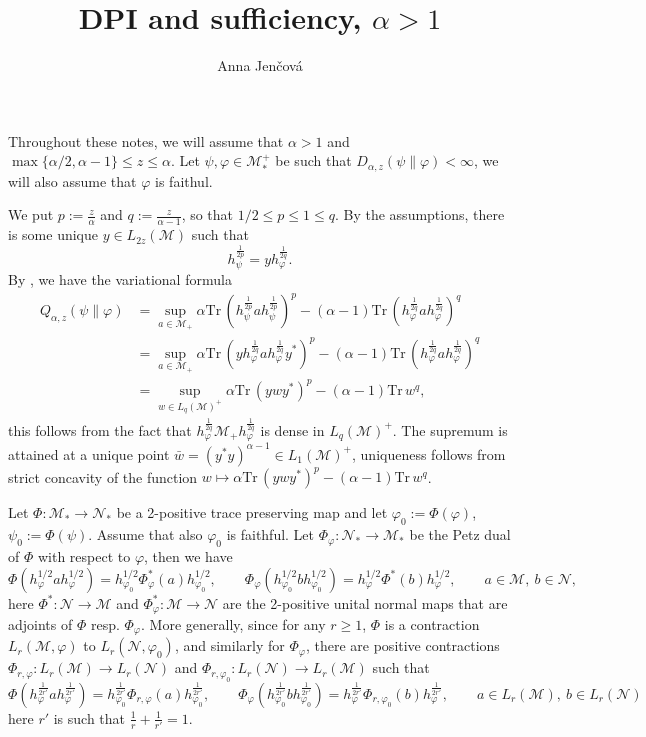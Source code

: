 \documentclass[12pt]{article}
\title{DPI and sufficiency, $\alpha>1$}
\author{Anna Jen\v cov\'a}
\theoremstyle{definition}
\theoremstyle{remark}
\def\Me{\mathcal M}
\def\Ne{\mathcal N}
\def \Tr{\mathrm{Tr}\,}
\begin{document}
\maketitle

Throughout these notes, we will assume that $\alpha>1$ and $\max\{\alpha/2,\alpha-1\}\le
z\le \alpha$. Let $\psi,\varphi\in \Me_*^+$ be such that
$D_{\alpha,z}(\psi\|\varphi)<\infty$, we will also assume that $\varphi$ is faithul. 

We put $p:=\frac z{\alpha}$ and $q:=\frac z{\alpha-1}$, so that $1/2\le p\le 1\le q$. By the
assumptions, there is some unique $y\in L_{2z}(\Me)$ such that 
\begin{equation}\label{eq:y}
h_\psi^{\frac1{2p}}=yh_\varphi^{\frac1{2q}}.
\end{equation}
By \cite{kato2023onrenyi,SKnote}, we have the variational formula
\begin{align*}
Q_{\alpha,z}(\psi\|\varphi)&=\sup_{a\in \Me_+} \alpha
\Tr(h_\psi^{\frac1{2p}}ah_\psi^{\frac1{2p}})^p-(\alpha-1)\Tr(h_\varphi^{\frac1{2q}}ah_\varphi^{\frac1{2q}})^q\\
&=\sup_{a\in \Me_+} \alpha
\Tr(yh_\varphi^{\frac1{2q}}ah_\varphi^{\frac1{2q}}y^*)^p-(\alpha-1)\Tr(h_\varphi^{\frac1{2q}}ah_\varphi^{\frac1{2q}})^q\\
&=\sup_{w\in L_q(\Me)^+}\alpha\Tr(ywy^*)^p-(\alpha-1)\Tr w^q,
\end{align*}
this follows from the fact that $h_\varphi^{\frac1{2q}}\Me_+h_\varphi^{\frac1{2q}}$ is
dense in $L_q(\Me)^+$. The supremum is attained at a unique point $\bar
w=(y^*y)^{\alpha-1}\in L_1(\Me)^+$, uniqueness follows from strict concavity of the
function $w\mapsto \alpha\Tr(ywy^*)^p-(\alpha-1)\Tr w^q$. 

Let $\Phi:\Me_*\to \Ne_*$ be a 2-positive trace preserving map and let 
$\varphi_0:=\Phi(\varphi)$, $\psi_0:=\Phi(\psi)$. Assume that also $\varphi_0$ is faithful. Let $\Phi_\varphi:
\Ne_*\to\Me_*$ be the Petz dual of $\Phi$ with respect to $\varphi$, then we have
\[
\Phi(h_\varphi^{1/2}ah_\varphi^{1/2})=h_{\varphi_0}^{1/2}\Phi_\varphi^*(a)h_{\varphi_0}^{1/2},\qquad 
\Phi_\varphi(h_{\varphi_0}^{1/2}bh_{\varphi_0}^{1/2})=h_{\varphi}^{1/2}\Phi^*(b)h_{\varphi}^{1/2},
\qquad a\in \Me,\ b\in \Ne,
\]
here $\Phi^*:\Ne\to\Me$ and $\Phi^*_\varphi:\Me\to \Ne$ are the 2-positive unital normal
maps that are adjoints of $\Phi$ resp. $\Phi_\varphi$. More generally, since for any $r\ge
1$, $\Phi$ is a contraction $L_r(\Me,\varphi)$ to $L_r(\Ne,\varphi_0)$, and similarly for
$\Phi_\varphi$, there are positive contractions $\Phi_{r,\varphi}:L_r(\Me)\to L_r(\Ne)$
and $\Phi_{r,\varphi_0}:L_r(\Ne)\to L_r(\Me)$ such that 
\[
\Phi(h_\varphi^{\frac1{2r'}}ah_\varphi^{\frac1{2r'}})=h_{\varphi_0}^{\frac1{2r'}}\Phi_{r,\varphi}(a)h_{\varphi_0}^{\frac1{2r'}},\qquad 
\Phi_\varphi(h_{\varphi_0}^{\frac1{2r'}}bh_{\varphi_0}^{\frac1{2r'}})=h_{\varphi}^{\frac1{2r'}}\Phi_{r,\varphi_0}(b)h_{\varphi}^{\frac1{2r'}},
\qquad a\in L_r(\Me),\ b\in L_r(\Ne)
\]
here $r'$ is such that $\frac1r+\frac1{r'}=1$.
\end{document}
